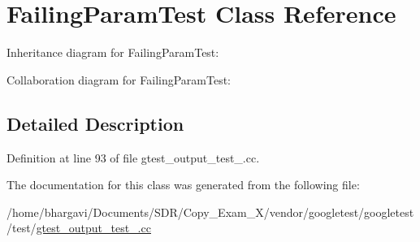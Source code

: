 \hypertarget{class_failing_param_test}{}\section{Failing\+Param\+Test Class Reference}
\label{class_failing_param_test}


Inheritance diagram for Failing\+Param\+Test\+:


Collaboration diagram for Failing\+Param\+Test\+:


\subsection{Detailed Description}


Definition at line 93 of file gtest\+\_\+output\+\_\+test\+\_\+.\+cc.



The documentation for this class was generated from the following file\+:\begin{DoxyCompactItemize}
\item 
/home/bhargavi/\+Documents/\+S\+D\+R/\+Copy\+\_\+\+Exam\+\_\+X/vendor/googletest/googletest/test/\hyperlink{gtest__output__test___8cc}{gtest\+\_\+output\+\_\+test\+\_\+.\+cc}\end{DoxyCompactItemize}

